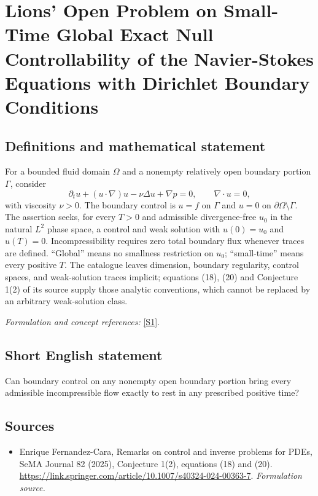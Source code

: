 \documentclass[11pt]{article}
\begin{document}
\section*{\texorpdfstring{Lions' Open Problem on Small-Time Global Exact Null Controllability of the Navier-Stokes Equations with Dirichlet Boundary Conditions}{Lions' Open Problem on Small-Time Global Exact Null Controllability of the Navier-Stokes Equations with Dirichlet Boundary Conditions}}\label{329}
\subsection{Definitions and mathematical statement}
For a bounded fluid domain $\Omega$ and a nonempty relatively open boundary portion $\Gamma$, consider
\[
 \partial_tu+(u\cdot\nabla)u-\nu\Delta u+\nabla p=0,
 \qquad\nabla\cdot u=0,
\]
with viscosity $\nu>0$. The boundary control is $u=f$ on $\Gamma$ and $u=0$ on $\partial\Omega\setminus\Gamma$. The assertion seeks, for every $T>0$ and admissible divergence-free $u_0$ in the natural $L^2$ phase space, a control and weak solution with $u(0)=u_0$ and $u(T)=0$. Incompressibility requires zero total boundary flux whenever traces are defined. ``Global'' means no smallness restriction on $u_0$; ``small-time'' means every positive $T$. The catalogue leaves dimension, boundary regularity, control spaces, and weak-solution traces implicit; equations (18), (20) and Conjecture 1(2) of its source supply those analytic conventions, which cannot be replaced by an arbitrary weak-solution class.
\par\smallskip\textit{Formulation and concept references:} \href{https://link.springer.com/article/10.1007/s40324-024-00363-7}{[S1]}.

\subsection{Short English statement}
Can boundary control on any nonempty open boundary portion bring every admissible incompressible flow exactly to rest in any prescribed positive time?
\subsection{Sources}
\begin{itemize}
\item[S1]Enrique Fernandez-Cara, Remarks on control and inverse problems for PDEs, SeMA Journal 82 (2025), Conjecture 1(2), equations (18) and (20).
\url{https://link.springer.com/article/10.1007/s40324-024-00363-7}.
\textit{Formulation source.}
\end{itemize}
\end{document}
